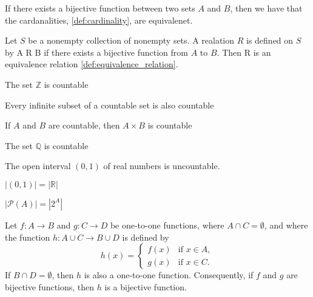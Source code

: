 \documentclass[../main.tex]{subfiles}
\begin{document}
\begin{theorem}
If there exists a bijective function between two sets $A$ and $B$, then we have that the cardanalities, \ref{def:cardinality}, are equivalenet. 
\end{theorem}


\begin{exercise}
Let $S$ be a nonempty collection of nonempty sets. A realation $R$ is defined on $S$ by A R B if there exists a bijective function from $A$ to $B$. Then R is an equivalence relation \ref{def:equivalence_relation}.
\end{exercise}


\begin{proposition}
The set $\mathbb{Z}$ is countable
\end{proposition}


\begin{proposition}
Every infinite subset of a countable set is also countable
\end{proposition}


\begin{proposition}
If $A$ and $B$ are countable, then $A \times B$ is countable
\end{proposition}





\begin{theorem}
The set $\mathbb{Q}$ is countable
\end{theorem}


\begin{theorem}
The open interval $(0,1)$ of real numbers is uncountable.
\end{theorem}

\begin{theorem}
\( |(0,1)| = |\mathbb{R}| \)
\end{theorem}




\begin{theorem}
\( |\mathcal{P}(A)| = |2^A| \)
\end{theorem}




\begin{lemma}

    Let \( f: A \to B \) and \( g: C \to D \) be one-to-one functions, where \( A \cap C = \emptyset \), and where the function \( h: A \cup C \to B \cup D \) is defined by
    \[
    h(x) =
    \begin{cases} 
    f(x) & \text{if } x \in A, \\
    g(x) & \text{if } x \in C.
    \end{cases}
    \]
    If \( B \cap D = \emptyset \), then \( h \) is also a one-to-one function. Consequently, if \( f \) and \( g \) are bijective functions, then \( h \) is a bijective function.
\end{lemma}
\end{document}
